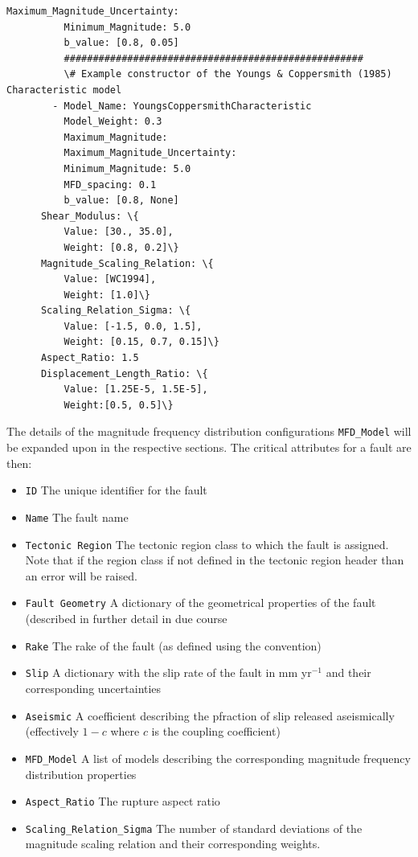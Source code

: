 \begin{Verbatim}[frame=single, commandchars=\\\{\}, fontsize=\scriptsize]
          Maximum_Magnitude_Uncertainty:
          Minimum_Magnitude: 5.0
          b_value: [0.8, 0.05]
          ####################################################
          \# Example constructor of the Youngs & Coppersmith (1985) Characteristic model
        - Model_Name: YoungsCoppersmithCharacteristic
          Model_Weight: 0.3
          Maximum_Magnitude:
          Maximum_Magnitude_Uncertainty:
          Minimum_Magnitude: 5.0
          MFD_spacing: 0.1
          b_value: [0.8, None]
      Shear_Modulus: \{
          Value: [30., 35.0],
          Weight: [0.8, 0.2]\}
      Magnitude_Scaling_Relation: \{
          Value: [WC1994],
          Weight: [1.0]\}
      Scaling_Relation_Sigma: \{
          Value: [-1.5, 0.0, 1.5],
          Weight: [0.15, 0.7, 0.15]\}
      Aspect_Ratio: 1.5
      Displacement_Length_Ratio: \{
          Value: [1.25E-5, 1.5E-5],
          Weight:[0.5, 0.5]\}
\end{Verbatim}

The details of the magnitude frequency distribution configurations \verb=MFD_Model= will be expanded upon in the respective sections. The critical attributes for a fault are then:

\begin{itemize}
\item \verb=ID= The unique identifier for the fault
\item \verb=Name= The fault name
\item \verb=Tectonic Region= The tectonic region class to which the fault is assigned. Note that if the region class if not defined in the tectonic region header than an error will be raised.
\item \verb=Fault Geometry= A dictionary of the geometrical properties of the fault (described in further detail in due course
\item \verb=Rake= The rake of the fault (as defined using the \cite{aki2002} convention)
\item \verb=Slip= A dictionary with the slip rate of the fault in mm yr$^{-1}$ and their corresponding uncertainties
\item \verb=Aseismic= A coefficient describing the pfraction of slip released aseismically (effectively $1 - c$ where $c$ is the coupling coefficient)
\item \verb=MFD_Model= A list of models describing the corresponding magnitude frequency distribution properties
\item \verb=Aspect_Ratio= The rupture aspect ratio
\item \verb=Scaling_Relation_Sigma= The number of standard deviations of the magnitude scaling relation and their corresponding weights. 
\end{itemize}

